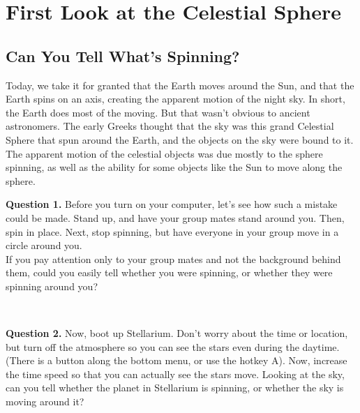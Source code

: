 \documentclass[11pt]{article}
\begin{document}
\newpage

\section{First Look at the Celestial Sphere}

\subsection{Can You Tell What's Spinning?}

Today, we take it for granted that the Earth moves around the Sun, and that the Earth spins on an axis, creating the apparent motion of the night sky. In short, the Earth does most of the moving. But that wasn't obvious to ancient astronomers. The early Greeks thought that the sky was this grand Celestial Sphere that spun around the Earth, and the objects on the sky were bound to it. The apparent motion of the celestial objects was due mostly to the sphere spinning, as well as the ability for some objects like the Sun to move along the sphere.

\noindent
\textbf{Question 1.} Before you turn on your computer, let's see how such a mistake could be made. Stand up, and have your group mates stand around you. Then, spin in place. Next, stop spinning, but have everyone in your group move in a circle around you.\\

If you pay attention only to your group mates and not the background behind them, could you easily tell whether you were spinning, or whether they were spinning around you?\\
\vspace*{1.5cm}

\hrulefill\\
\noindent

\textbf{Question 2.} Now, boot up Stellarium. Don't worry about the time or location, but turn off the atmosphere so you can 
see the stars even during the daytime.
(There is a button along the bottom menu, or use the hotkey A). Now, increase the time speed so that you can actually see the stars move. Looking at the sky, can you tell whether the planet in Stellarium is spinning, or whether the sky is moving around it?\\
\vspace*{1.5cm}


\hrulefill\\

\newpage
\end{document}
